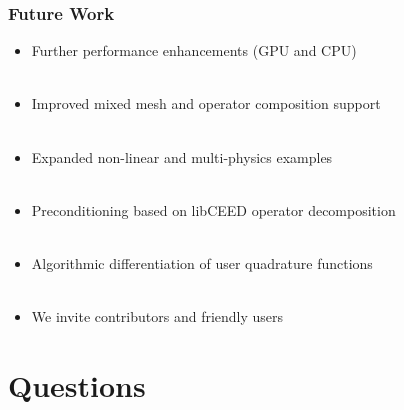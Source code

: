 \documentclass{beamer}
\begin{document}
\begin{frame}
\begin{center}
\frametitle{Future Work}

\begin{itemize}

\item Further performance enhancements (GPU and CPU)\\

~\\

\item Improved mixed mesh and operator composition support\\

~\\

\item Expanded non-linear and multi-physics examples\\

~\\

\item Preconditioning based on libCEED operator decomposition\\

~\\

\item Algorithmic differentiation of user quadrature functions\\

~\\

\item We invite contributors and friendly users

\end{itemize}

\end{center}
\end{frame}

\section{Questions}
\end{document}
